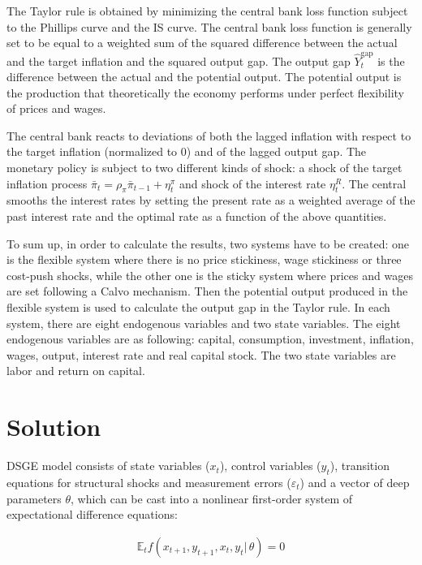 \documentclass{pracamgr}
\numberwithin{equation}{section}
\begin{document}
The Taylor rule is obtained by minimizing the central bank loss function subject to the Phillips curve and the IS curve. The central bank loss function is generally set to be equal to a weighted sum of the squared difference between the actual and the target inflation and the squared output gap. The output gap $\hat{Y}_{t}^{\text{gap}}$ is the difference between the actual and the potential output. The potential output is the production that theoretically the economy performs under perfect flexibility of prices and wages.

The central bank reacts to deviations of both the lagged inflation with respect to the target inflation (normalized to 0) and of the lagged output gap. The monetary policy is subject to two different kinds of shock: a shock of the target inflation process $ \bar{\pi}_{t} = \rho_{\pi} \bar{\pi}_{t-1} + \eta_{t}^{\pi}$ and shock
of the interest rate $\eta_{t}^{R}$. The central smooths the interest rates by setting the present rate as a weighted average of the past interest rate and the optimal rate as a function of the above quantities.

To sum up, in order to calculate the results, two systems have to be created: one is the flexible system where there is no price stickiness, wage stickiness or three cost-push shocks, while the other one is the sticky system where prices and wages are set following a Calvo mechanism. Then the potential output produced in the flexible system is used to calculate the output gap in the Taylor rule. In each system, there are eight endogenous variables and two state variables. The eight endogenous variables are as following: capital, consumption, investment, inflation, wages, output, interest rate and real capital stock. The two state variables are labor and return on capital.

\section{Solution}

DSGE model consists of state variables ($x_{t}$), control variables ($y_{t}$), transition equations for structural shocks and measurement errors ($\varepsilon_{t}$) and a vector of deep parameters $\theta$, which can be cast into a nonlinear first-order system of expectational difference equations:

\begin{align}
\mathbb{E}_{t}f\left(x_{t+1},y_{t+1},x_{t},y_{t} | \, \theta \right) = 0
\end{align}
\end{document}
